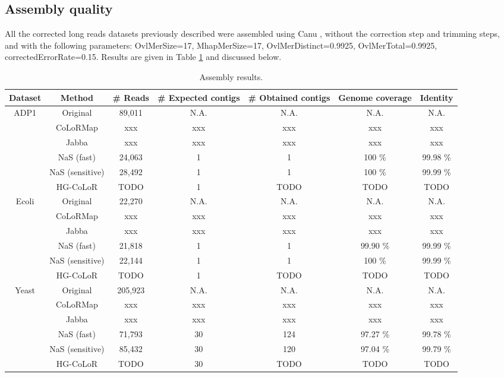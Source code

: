 \documentclass[long, final]{jobim2017}
\begin{document}
\subsection{Assembly quality}
	
All the corrected long reads datasets previously described were assembled using Canu \cite{Koren2016}, without the correction step and trimming steps, and with the following parameters: OvlMerSize=17, MhapMerSize=17, OvlMerDistinct=0.9925, OvlMerTotal=0.9925, correctedErrorRate=0.15. Results are given in Table \ref{tabres3} and discussed below.

\begin{table}[ht]
	\begin{center}
	\begin{tabular}{|c|c|c|c|c|c|c|}
		\hline
		\textbf{Dataset} & \textbf{Method} & \textbf{\# Reads} & \textbf{\# Expected contigs} & \textbf{\# Obtained contigs} & \textbf{Genome coverage} 
		& \textbf{Identity} \\
		\hline
		\multirow{6}{*}{ADP1} & Original & 89,011 & N.A. & N.A. & N.A. & N.A. \\
		& CoLoRMap & xxx & xxx & xxx & xxx & xxx \\
		& Jabba & xxx & xxx & xxx & xxx & xxx \\
		& NaS (fast) & 24,063 & 1 & 1 & 100 \% & 99.98 \% \\
		& NaS (sensitive) & 28,492 & 1 & 1 & 100 \% & 99.99 \% \\
		& HG-CoLoR & TODO & 1 & TODO & TODO & TODO \\
		\hline
		\multirow{6}{*}{Ecoli} & Original & 22,270 & N.A. & N.A. & N.A. & N.A. \\
		& CoLoRMap & xxx & xxx & xxx & xxx & xxx \\
		& Jabba & xxx & xxx & xxx & xxx & xxx \\
		& NaS (fast) & 21,818 & 1 & 1 & 99.90 \% & 99.99 \% \\
		& NaS (sensitive) & 22,144 & 1 & 1 & 100 \% & 99.99 \% \\
		& HG-CoLoR & TODO & 1 & TODO & TODO & TODO \\
		\hline
		\multirow{6}{*}{Yeast} & Original & 205,923 & N.A. & N.A. & N.A. & N.A. \\
		& CoLoRMap & xxx & xxx & xxx & xxx & xxx \\
		& Jabba & xxx & xxx & xxx & xxx & xxx \\
		& NaS (fast) & 71,793 & 30 & 124 & 97.27 \% & 99.78 \% \\
		& NaS (sensitive) & 85,432 & 30 & 120 & 97.04 \% & 99.79 \% \\
		& HG-CoLoR & TODO & 30 & TODO & TODO & TODO \\
		\hline
	\end{tabular}
	\end{center}
	\caption{Assembly results. \label{tabres3}}
\end{table}
\end{document}
